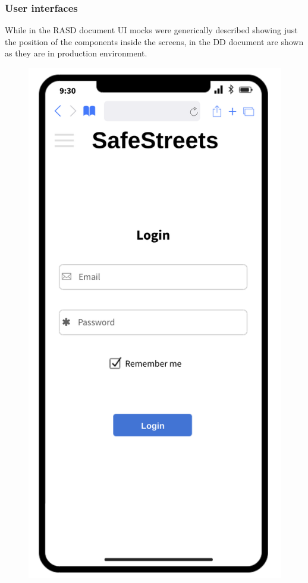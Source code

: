 \subsubsection{User interfaces}
While in the RASD document UI mocks were generically described showing just the position of the components inside the screens, in the DD document are shown as they are in production environment.

\begin{figure}[H]
	\centering
	\begin{minipage}[b]{0.40\textwidth}
		\includegraphics[width=\textwidth]{Images/dd-mocks/login.png}

\end{minipage}
\end{figure}
